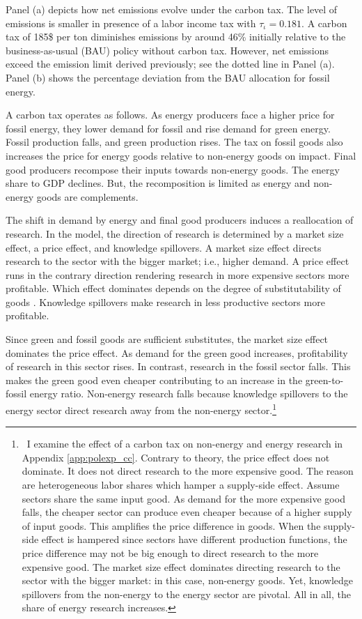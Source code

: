 Panel (a) depicts how net emissions evolve under the carbon tax. The level of emissions is smaller in presence of a labor income tax with $\tau_{\iota}=0.181$.   A carbon tax of 185\$ per ton diminishes emissions by around 46\% initially relative to the business-as-usual (BAU) policy without carbon tax. However, net emissions exceed the emission limit  derived previously; see the dotted line in Panel (a). Panel (b) shows the percentage deviation from the BAU allocation for fossil energy.
  
A carbon tax operates as follows. As energy producers face a higher price for fossil energy, they lower demand for fossil and rise demand for green energy. Fossil production falls, and green production rises.
 The tax on fossil goods also increases the price for energy goods relative to non-energy goods on impact. Final good producers recompose their inputs towards non-energy goods. The energy share to GDP declines.  But, the recomposition is limited as energy and non-energy goods are complements. 
 
 The shift in demand by energy and final good producers induces a reallocation of research. In the model, the direction of research is determined by a market size effect, a price effect, and knowledge spillovers. 
 A market size effect directs research to the sector with the bigger market; i.e., higher demand. A price effect runs in the contrary direction rendering research in more expensive sectors more profitable. Which effect dominates depends on the degree of substitutability of goods \citep{Hemous2021DirectedEconomics}. Knowledge spillovers make research in less productive sectors more profitable.
 
 Since green and fossil goods are sufficient substitutes, the market size effect dominates the price effect. As demand for the green good increases, profitability of research in  this sector rises. In contrast, research in the fossil sector falls. This makes the green good even cheaper contributing to an increase in the green-to-fossil energy ratio.
Non-energy research falls because knowledge spillovers to the energy sector direct research away from the non-energy sector.\footnote{\ I examine the effect of a carbon tax on non-energy and energy research in Appendix \ref{app:polexp_cc}. Contrary to theory, the price effect does not dominate. It does not direct research to the more expensive good. The reason are heterogeneous labor shares which hamper a supply-side effect. Assume sectors share the same input good. As demand for the more expensive good falls, the cheaper sector can produce even cheaper because of a higher supply of input goods. This amplifies the price difference in goods. When the supply-side effect is hampered since sectors have different production functions, the price difference may not be big enough to direct research to the more expensive good. The market size effect dominates directing research to the sector with the bigger market: in this case, non-energy goods. Yet, knowledge spillovers from the non-energy to the energy sector are pivotal. All in all, the share of energy research increases.}
 
